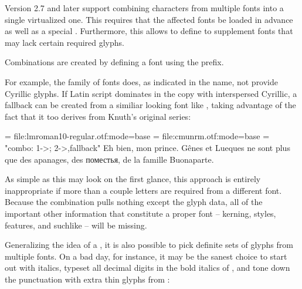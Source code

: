 Version 2.7 and later support combining characters from multiple fonts into a
single virtualized one. This requires that the affected fonts be loaded in
advance as well as a special . Furthermore, this
allows to define  to supplement fonts that may lack
certain required glyphs.

Combinations are created by defining a font using the  prefix.


For example, the  family of fonts does, as indicated
in the name, not provide Cyrillic glyphs. If Latin script dominates in the copy
with interspersed Cyrillic, a fallback can be created from a similiar looking
font like , taking advantage of the fact
that it too derives from Knuth’s original  series:

\beginlisting
  
  \font \lm  = file:lmroman10-regular.otf:mode=base
  \font \cmu = file:cmunrm.otf:mode=base
  \font \lmu = "combo: 1->\fontid\lm; 2->\fontid\cmu,fallback"
  \lmu Eh bien, mon prince. Gênes et Lueques ne sont plus que des
       apanages, des поместья, de la famille Buonaparte.
  \bye
\endlisting

As simple as this may look on the first glance, this approach is entirely
inappropriate if more than a couple letters are required from a different font.
Because the combination pulls nothing except the glyph data, all of the
important other information that constitute a proper font -- kerning, styles,
features, and suchlike -- will be missing.

\endsubsection %


Generalizing the idea of a , it is also possible to
pick definite sets of glyphs from multiple fonts. On a bad day, for instance,
it may be the sanest choice to start out with  italics,
typeset all decimal digits in the bold italics of ,
and tone down the punctuation with extra thin glyphs from :

\beginlisting
  \def \feats     {-tlig;-liga;mode=base;-kern}
  \def \fileone   {EBGaramond12-Italic.otf}
  \def \filetwo   {FreeMonoBoldOblique.otf}
  \def \filethree {SourceSansPro-ExtraLight.otf}

  

